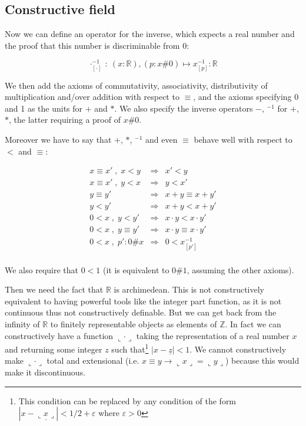 \documentclass[a4paper,11pt]{article}
\newcommand{\R}{\mathbb{R}}
\newcommand{\Z}{\mathbb{Z}}
\theoremstyle{definition}
\theoremstyle{remark}
\begin{document}
\subsection{Constructive field}

  Now we can define an operator for the inverse, which expects a real number and the
  proof that this number is discriminable from 0:

  \[
    \cdot^{-1}_{[\cdot]} \ : \  (x:\R), (p:x\#0) \mapsto x^{-1}_{[p]} : \R
  \]

  We then add the axioms of commutativity, associativity, distributivity of multiplication and/over
  addition with respect to $≡$, and the axioms specifying 0 and 1 as the units for $+$ and $*$. We also specify the inverse operators $-$, $^{-1}$ for $+$, $*$, the latter requiring a proof of $x\#0$.

  Moreover we have to say that $+$, $*$, $^{-1}$ and even $≡$ behave well with respect to $<$ and $≡$:

  \[
    \begin{array}{rcl}
      x ≡ x' \;,\; x < y   &  \Rightarrow  & x' < y \\
      x ≡ x' \;,\; y < x   &  \Rightarrow  & y < x' \\
      y ≡ y'               &  \Rightarrow  & x + y ≡ x + y' \\
      y < y'                    &  \Rightarrow  & x + y < x + y' \\
      0 < x \;,\; y < y'        &  \Rightarrow  & x \cdot y < x \cdot y' \\
      0 < x \;,\; y ≡ y'   &  \Rightarrow  & x \cdot y ≡ x \cdot y' \\
      0<x \;,\;  p':0\#x      &  \Rightarrow  & 0 < x^{-1}_{[p']} \\
    \end{array}
  \]

  We also require that $0<1$ (it is equivalent to $0\#1$, assuming the other axioms).

  Then we need the fact that $\R$ is archimedean. This is not constructively equivalent to having powerful tools like the integer part function, as it is not continuous thus not constructively definable. But we can get back from the infinity of $\R$ to finitely representable objects as elements of $\Z$. In fact we can constructively have a function $\llcorner \cdot \lrcorner$ taking the representation of a real number $x$ and returning some integer $z$ such that\footnote{This condition can be replaced by any condition of the form $| x-\underline {\llcorner x \lrcorner} | < 1/2+\varepsilon$ where $\varepsilon>0$} $| x-\underline z | < 1$. We cannot constructively make $\llcorner \cdot \lrcorner$ total and extensional (i.e. $x≡y → \llcorner x \lrcorner=\llcorner y \lrcorner$) because this would make it discontinuous.
\end{document}
